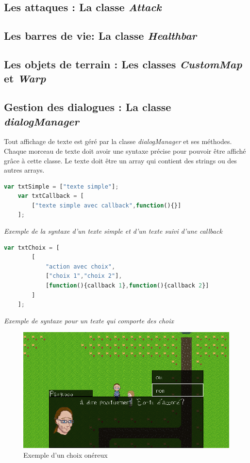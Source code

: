 \documentclass[11pt]{article}
\begin{document}
\subsection{Les attaques : La classe \textit{Attack}}
\subsection{Les barres de vie: La classe \textit{Healthbar}}
\subsection{Les objets de terrain : Les classes \textit{CustomMap} et \textit{Warp}}
\subsection{Gestion des dialogues : La classe \textit{dialogManager}}
Tout affichage de texte est géré par la classe \textit{dialogManager} et ses méthodes. 
Chaque morceau de texte doit avoir une syntaxe précise pour pouvoir être affiché grâce à cette classe. Le texte doit être un array qui contient des strings ou des autres arrays.
\begin{lstlisting}[language=JavaScript]
	var txtSimple = ["texte simple"];
	var txtCallback = [
		["texte simple avec callback",function(){}]
	];
\end{lstlisting}
\textit{Exemple de la syntaxe d'un texte simple et d'un texte suivi d'une callback}\\
\begin{lstlisting}[language=JavaScript]
	var txtChoix = [
		[
			"action avec choix",
			["choix 1","choix 2"],
			[function(){callback 1},function(){callback 2}]
		]
	];
\end{lstlisting} 
\textit{Exemple de syntaxe pour un texte qui comporte des choix}
\begin{figure}[H]
\includegraphics[scale=0.33]{choix}
\centering
\caption{Exemple d'un choix onéreux}

\end{figure}
\end{document}
